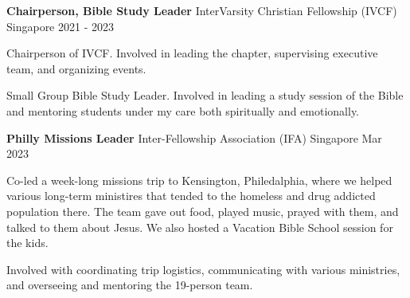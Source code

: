 

\begin{cventries}
    \cventry
    {\textbf{Chairperson, Bible Study Leader}} %
    {InterVarsity Christian Fellowship (IVCF)} %
    {Singapore} %
    {2021 - 2023} %
    { %
        \begin{cvitems}
            \item {Chairperson of IVCF. Involved in leading the chapter, supervising executive team, and organizing events.}
            \item {Small Group Bible Study Leader. Involved in leading a study session of the Bible and mentoring students under my care both spiritually and emotionally.}
        \end{cvitems}
    }
\end{cventries}

\begin{cventries}
    \cventry
    {\textbf{Philly Missions Leader}} %
    {Inter-Fellowship Association (IFA)} %
    {Singapore} %
    {Mar 2023} %
    { %
        \begin{cvitems}
            \item {Co-led a week-long missions trip to Kensington, Philedalphia, where we helped various long-term ministires that tended to the homeless and drug addicted population there. The team gave out food, played music, prayed with them, and talked to them about Jesus. We also hosted a Vacation Bible School session for the kids.}
            \item {Involved with coordinating trip logistics, communicating with various ministries, and overseeing and mentoring the 19-person team.}
        \end{cvitems}
    }
\end{cventries}

